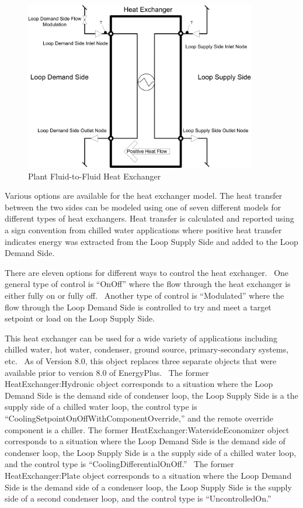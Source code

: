 \begin{figure}[hbtp] %
\centering
\includegraphics[width=0.9\textwidth, height=0.9\textheight, keepaspectratio=true]{media/image207.png}
\caption{Plant Fluid-to-Fluid Heat Exchanger \protect \label{fig:plant-fluid-to-fluid-heat-exchanger}}
\end{figure}

Various options are available for the heat exchanger model. The heat transfer between the two sides can be modeled using one of seven different models for different types of heat exchangers. Heat transfer is calculated and reported using a sign convention from chilled water applications where positive heat transfer indicates energy was extracted from the Loop Supply Side and added to the Loop Demand Side.

There are eleven options for different ways to control the heat exchanger.~ One general type of control is ``OnOff'' where the flow through the heat exchanger is either fully on or fully off.~ Another type of control is ``Modulated'' where the flow through the Loop Demand Side is controlled to try and meet a target setpoint or load on the Loop Supply Side.

This heat exchanger can be used for a wide variety of applications including chilled water, hot water, condenser, ground source, primary-secondary systems, etc.~ As of Version 8.0, this object replaces three separate objects that were available prior to version 8.0 of EnergyPlus.~ The former HeatExchanger:Hydronic object corresponds to a situation where the Loop Demand Side is the demand side of condenser loop, the Loop Supply Side is a the supply side of a chilled water loop, the control type is ``CoolingSetpointOnOffWithComponentOverride,'' and the remote override component is a chiller. The former HeatExchanger:WatersideEconomizer object corresponds to a situation where the Loop Demand Side is the demand side of condenser loop, the Loop Supply Side is a the supply side of a chilled water loop, and the control type is ``CoolingDifferentialOnOff.'' ~The former HeatExchanger:Plate object corresponds to a situation where the Loop Demand Side is the demand side of a condenser loop, the Loop Supply Side is the supply side of a second condenser loop, and the control type is ``UncontrolledOn.''

